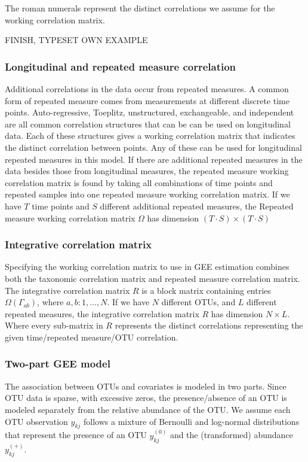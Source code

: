 \documentclass[12pt]{article}
\begin{document}
The roman numerals represent the distinct correlations we assume for the working correlation matrix.

FINISH, TYPESET OWN EXAMPLE


\subsubsection{Longitudinal and repeated measure correlation}

Additional correlations in the data occur from repeated measures. A common form of repeated measure comes from measurements at different discrete time points. Auto-regressive, Toeplitz, unstructured, exchangeable, and independent are all common correlation structures that can be can be used on longitudinal data. Each of these structures gives a working correlation matrix that indicates the distinct correlation between points. Any of these can be used for longitudinal repeated measures in this model. If there are additional repeated measures in the data besides those from longitudinal measures, the repeated measure working correlation matrix is found by taking all combinations of time points and repeated samples into one repeated measure working correlation matrix. If we have $T$ time points and $S$ different additional repeated measures, the Repeated measure working correlation matrix $\Omega$ has dimension $(T \cdot S) \times (T \cdot S ) $

\subsubsection{Integrative correlation matrix }

Specifying the working correlation matrix to use in GEE estimation combines both the taxonomic correlation matrix and repeated measure correlation matrix. The integrative correlation matrix $R$ is a block matrix containing entries $\Omega(\Gamma_{ab})$, where $a,b: 1, \ldots , N$. If we have $N$ different OTUs, and $L$ different repeated measures, the integrative correlation matrix $R$ has dimension $N \times L$. Where every sub-matrix in $R$ represents the distinct correlations representing the given time/repeated measure/OTU correlation.


\subsubsection{Two-part GEE model}

The association between OTUs and covariates is modeled in two parts. Since OTU data is sparse, with excessive zeros, the presence/absence of an OTU is modeled separately from the relative abundance of the OTU. We assume each OTU observation $y_{kj}$ follows a mixture of Bernoulli and log-normal distributions that represent the presence of an OTU $y_{kj}^{(0)}$ and the (transformed) abundance $y_{kj}^{(+)}$.
\end{document}
